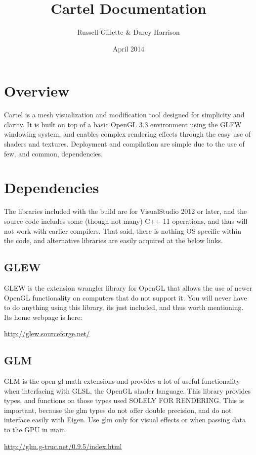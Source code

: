 \documentclass{article}
\title{Cartel Documentation}
\author{Russell Gillette \& Darcy Harrison}
\date{April 2014}
\begin{document}
\maketitle

\section{Overview}
Cartel is a mesh visualization and modification tool designed for simplicity and clarity. It is built on top of a basic OpenGL 3.3 environment using the GLFW windowing system, and enables complex rendering effects through the easy use of shaders and textures. Deployment and compilation are simple due to the use of few, and common, dependencies.

\section{Dependencies}
The libraries included with the build are for VisualStudio 2012 or later, and the source code includes some (though not many) C++ 11 operations, and thus will not work with earlier compilers. That said, there is nothing OS specific within the code, and alternative libraries are easily acquired at the below links.

\subsection{GLEW}
GLEW is the extension wrangler library for OpenGL that allows the use of newer OpenGL functionality on computers that do not support it. You will never have to do anything using this library, its just included, and thus worth mentioning. Its home webpage is here:
\begin{center}\url{http://glew.sourceforge.net/}\end{center}

\subsection{GLM}
GLM is the open gl math extensions and provides a lot of useful functionality when interfacing with GLSL, the OpenGL shader language. This library provides types, and functions on those types used SOLELY FOR RENDERING. This is important, because the glm types do not offer double precision, and do not interface easily with Eigen. Use glm only for visual effects or when passing data to the GPU in main.
\begin{center}\url{http://glm.g-truc.net/0.9.5/index.html}\end{center}
\end{document}
